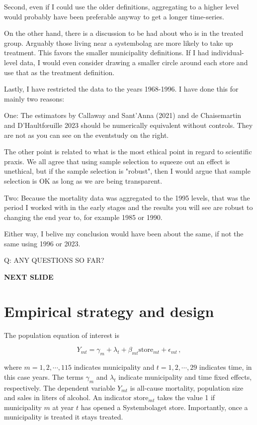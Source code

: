 \documentclass[12pt]{article}
\begin{document}
Second, even if I could use the older definitions, aggregating to a higher level would probably have been preferable anyway to get a longer time-series. 

On the other hand, there is a discussion to be had about who is in the treated group. Arguably those living near a systembolag are more likely to take up treatment. This favors the smaller municipality definitions. If I had individual-level data, I would even consider drawing a smaller circle around each store and use that as the treatment definition.

Lastly, I have restricted the data to the years 1968-1996. I have done this for mainly two reasons:

One: The estimators by Callaway and Sant'Anna (2021) and de Chaisemartin and D'Haultfœuille 2023 should be numerically equivalent without controls. They are not as you can see on the eventstudy on the right.

The other point is related to what is the most ethical point in regard to scientific praxis. We all agree that using sample selection to squeeze out an effect is unethical, but if the sample selection is "robust", then I would argue that sample selection is OK as long as we are being transparent.

Two: Because the mortality data was aggregated to the 1995 levels, that was the period I worked with in the early stages and the results you will see are robust to changing the end year to, for example 1985 or 1990.

Either way, I belive my conclusion would have been about the same, if not the same using 1996 or 2023.

Q: ANY QUESTIONS SO FAR?

 \textbf{NEXT SLIDE}

 \section{Empirical strategy and design}

The population equation of interest is

\begin{equation}
    Y_{mt} = \gamma_m + \lambda_t + \beta_{mt}  \text{store}_{mt} + \epsilon_{mt}\, ,
    \label{eq:pop-eq-of-interest}
\end{equation}

where $m = 1,2,\cdots, 115$ indicates municipality and $t = 1,2, \cdots, 29$ indicates time, in this case years. The terms $\gamma_m$ and $\lambda_t$ indicate municipality and time fixed effects, respectively. The dependent variable $Y_{mt}$ is all-cause mortality, population size and sales in liters of alcohol. An indicator $\text{store}_{mt}$ takes the value 1 if municipality $m$ at year $t$ has opened a Systembolaget store. Importantly, once a municipality is treated it stays treated. 
\end{document}
